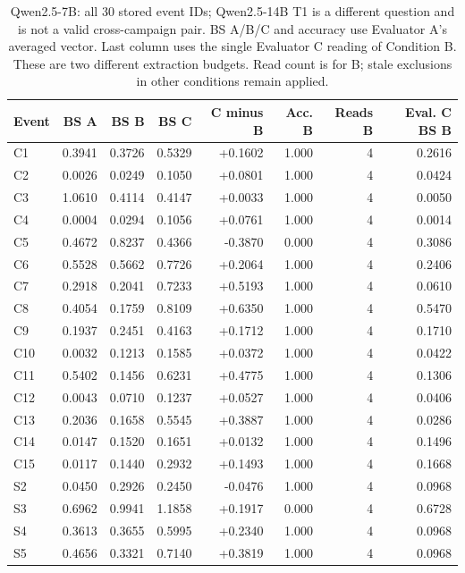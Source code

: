 \begin{table}[!htbp]
\centering\small
\caption{Qwen2.5-7B: all 30 stored event IDs; Qwen2.5-14B T1 is a different question and is not a valid cross-campaign pair. BS A/B/C and accuracy use Evaluator A's averaged vector. Last column uses the single Evaluator C reading of Condition B. These are two different extraction budgets. Read count is for B; stale exclusions in other conditions remain applied.}
\label{tab:full_events_qwen257b}
\begin{tabular}{lrrrrrrr}
\toprule
Event & BS A & BS B & BS C & C minus B & Acc. B & Reads B & Eval. C BS B \\
\midrule
C1 & 0.3941 & 0.3726 & 0.5329 & +0.1602 & 1.000 & 4 & 0.2616 \\
C2 & 0.0026 & 0.0249 & 0.1050 & +0.0801 & 1.000 & 4 & 0.0424 \\
C3 & 1.0610 & 0.4114 & 0.4147 & +0.0033 & 1.000 & 4 & 0.0050 \\
C4 & 0.0004 & 0.0294 & 0.1056 & +0.0761 & 1.000 & 4 & 0.0014 \\
C5 & 0.4672 & 0.8237 & 0.4366 & -0.3870 & 0.000 & 4 & 0.3086 \\
C6 & 0.5528 & 0.5662 & 0.7726 & +0.2064 & 1.000 & 4 & 0.2406 \\
C7 & 0.2918 & 0.2041 & 0.7233 & +0.5193 & 1.000 & 4 & 0.0610 \\
C8 & 0.4054 & 0.1759 & 0.8109 & +0.6350 & 1.000 & 4 & 0.5470 \\
C9 & 0.1937 & 0.2451 & 0.4163 & +0.1712 & 1.000 & 4 & 0.1710 \\
C10 & 0.0032 & 0.1213 & 0.1585 & +0.0372 & 1.000 & 4 & 0.0422 \\
C11 & 0.5402 & 0.1456 & 0.6231 & +0.4775 & 1.000 & 4 & 0.1306 \\
C12 & 0.0043 & 0.0710 & 0.1237 & +0.0527 & 1.000 & 4 & 0.0406 \\
C13 & 0.2036 & 0.1658 & 0.5545 & +0.3887 & 1.000 & 4 & 0.0286 \\
C14 & 0.0147 & 0.1520 & 0.1651 & +0.0132 & 1.000 & 4 & 0.1496 \\
C15 & 0.0117 & 0.1440 & 0.2932 & +0.1493 & 1.000 & 4 & 0.1668 \\
S2 & 0.0450 & 0.2926 & 0.2450 & -0.0476 & 1.000 & 4 & 0.0968 \\
S3 & 0.6962 & 0.9941 & 1.1858 & +0.1917 & 0.000 & 4 & 0.6728 \\
S4 & 0.3613 & 0.3655 & 0.5995 & +0.2340 & 1.000 & 4 & 0.0968 \\
S5 & 0.4656 & 0.3321 & 0.7140 & +0.3819 & 1.000 & 4 & 0.0968 \\

\end{tabular}
\end{table}
